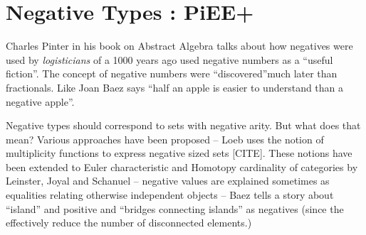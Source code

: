 \documentclass[preprint]{sigplanconf}
\begin{document}

\section{Negative Types : {{PiEE+}} }

Charles Pinter in his book on Abstract Algebra talks about how
negatives were used by \emph{logisticians} of a 1000 years ago used
negative numbers as a ``useful fiction''.  The concept of negative
numbers were ``discovered''much later than fractionals. Like Joan Baez
says ``half an apple is easier to understand than a negative apple''.

Negative types should correspond to sets with negative arity. But what
does that mean? Various approaches have been proposed -- Loeb uses the
notion of multiplicity functions to express negative sized sets
[CITE]. These notions have been extended to Euler characteristic and
Homotopy cardinality of categories by Leinster, Joyal and Schanuel --
negative values are explained sometimes as equalities relating
otherwise independent objects -- Baez tells a story about ``island''
and positive and ``bridges connecting islands'' as negatives (since
the effectively reduce the number of disconnected elements.)
\end{document}
